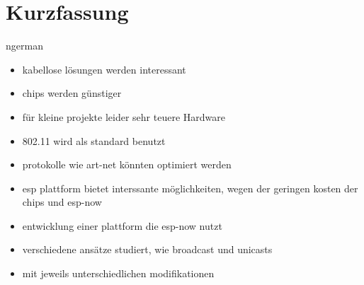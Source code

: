 \documentclass[]{ccs-thesis}
\begin{document}
\chapter*{Kurzfassung}
\begin{otherlanguage*}{ngerman}
\begin{itemize}
	\item kabellose lösungen werden interessant
	\item chips werden günstiger
	\item für kleine projekte leider sehr teuere Hardware
	\item 802.11 wird als standard benutzt
	\item protokolle wie art-net könnten optimiert werden
	\item esp plattform bietet interssante möglichkeiten, wegen der geringen kosten der chips und esp-now
	\item entwicklung einer plattform die esp-now nutzt
	\item verschiedene ansätze studiert, wie broadcast und unicasts
	\item mit jeweils unterschiedlichen modifikationen
\end{itemize}


\end{otherlanguage*}
\acresetall

\cleardoublepage
\tableofcontents
{}

\cleardoublepage
{}












% 

\cleardoublepage

\listofabbreviations
\clearpage

\listoffigures
\clearpage

\listoftables
\clearpage

\printbibliography
\end{document}
